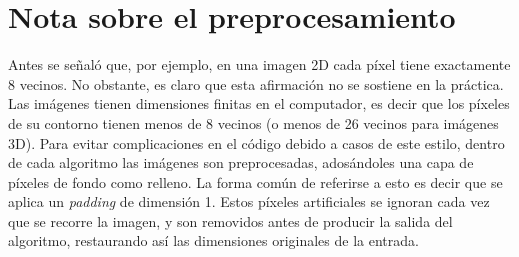 \section{Nota sobre el preprocesamiento} \label{sec:noteInfinity}
Antes se señaló que, por ejemplo, en una imagen 2D cada píxel tiene exactamente 8 vecinos. No obstante, es claro que esta afirmación no se sostiene en la práctica. Las imágenes tienen dimensiones finitas en el computador, es decir que los píxeles de su contorno tienen menos de 8 vecinos (o menos de 26 vecinos para imágenes 3D). Para evitar complicaciones en el código debido a casos de este estilo, dentro de cada algoritmo las imágenes son preprocesadas, adosándoles una capa de píxeles de fondo como relleno. La forma común de referirse a esto es decir que se aplica un \textit{padding} de dimensión 1. Estos píxeles artificiales se ignoran cada vez que se recorre la imagen, y son removidos antes de producir la salida del algoritmo, restaurando así las dimensiones originales de la entrada.